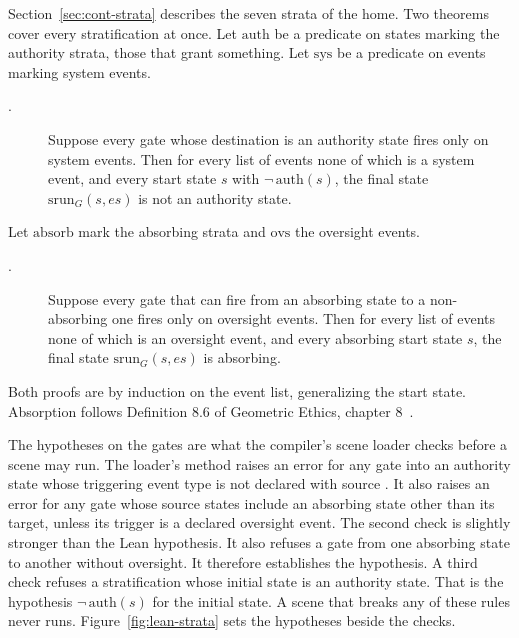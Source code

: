 Section~\ref{sec:cont-strata} describes the seven strata of the home.
Two theorems cover every stratification at once.
Let $\mathrm{auth}$ be a predicate on states marking the authority strata, those that grant
something.
Let $\mathrm{sys}$ be a predicate on events marking system events.
\begin{description}
  \item[.] Suppose every gate whose destination is an authority
  state fires only on system events.
  Then for every list of events none of which is a system event, and every start state $s$ with
  $\neg\,\mathrm{auth}(s)$, the final state $\mathrm{srun}_G(s, es)$ is not an authority state.
\end{description}
Let $\mathrm{absorb}$ mark the absorbing strata and $\mathrm{ovs}$ the oversight events.
\begin{description}
  \item[.] Suppose every gate that can fire from an absorbing state to a
  non-absorbing one fires only on oversight events.
  Then for every list of events none of which is an oversight event, and every absorbing start
  state $s$, the final state $\mathrm{srun}_G(s, es)$ is absorbing.
\end{description}
Both proofs are by induction on the event list, generalizing the start state.
Absorption follows Definition 8.6 of Geometric Ethics, chapter 8~\cite{bond2026geometricethics}.

The hypotheses on the gates are what the \erisml{} compiler's scene loader checks before a scene
may run.
The loader's method  raises an error for any gate into an authority
state whose triggering event type is not declared with source .
It also raises an error for any gate whose source states include an absorbing state other than
its target, unless its trigger is a declared oversight event.
The second check is slightly stronger than the Lean hypothesis.
It also refuses a gate from one absorbing state to another without oversight.
It therefore establishes the hypothesis.
A third check refuses a stratification whose initial state is an authority state.
That is the hypothesis $\neg\,\mathrm{auth}(s)$ for the initial state.
A scene that breaks any of these rules never runs.
Figure~\ref{fig:lean-strata} sets the hypotheses beside the checks.

